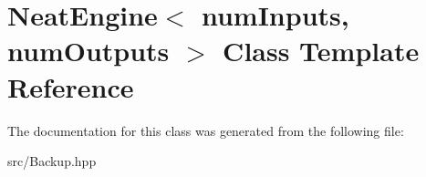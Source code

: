\hypertarget{class_neat_engine}{}\section{Neat\+Engine$<$ num\+Inputs, num\+Outputs $>$ Class Template Reference}
\label{class_neat_engine}


The documentation for this class was generated from the following file\+:\begin{DoxyCompactItemize}
\item 
src/Backup.\+hpp\end{DoxyCompactItemize}
